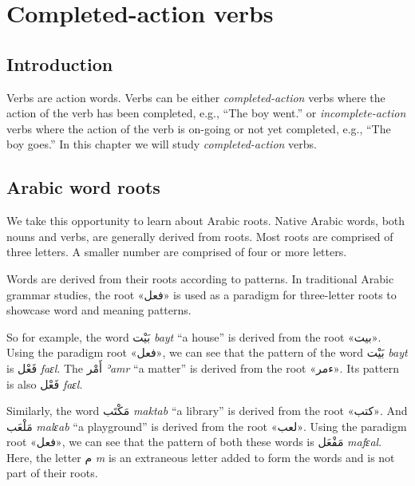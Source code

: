 \documentclass[
  10pt,
]{book}
\begin{document}
\chapter{Completed-action verbs}\label{completed-action-verbs}

\section{Introduction}\label{introduction-4}

Verbs are action words. Verbs can be either \emph{completed-action} verbs where the action of the verb has been completed, e.g., \enquote{The boy went.} or \emph{incomplete-action} verbs where the action of the verb is on-going or not yet completed, e.g., \enquote{The boy goes.} In this chapter we will study \emph{completed-action} verbs.

\section{Arabic word roots}\label{arabic-word-roots}

We take this opportunity to learn about Arabic roots.
Native Arabic words, both nouns and verbs, are generally derived from roots. Most roots are comprised of three letters. A smaller number are comprised of four or more letters.

Words are derived from their roots according to patterns. In traditional Arabic grammar studies, the root \foreignlanguage{arabic}{«فعل»} is used as a paradigm for three-letter roots to showcase word and meaning patterns.

So for example, the word \foreignlanguage{arabic}{بَيْت} \emph{bayt} \enquote{a house} is derived from the root \foreignlanguage{arabic}{«بيت»}. Using the paradigm root \foreignlanguage{arabic}{«فعل»}, we can see that the pattern of the word \foreignlanguage{arabic}{بَيْت} \emph{bayt} is \foreignlanguage{arabic}{فَعْل} \emph{faɛl}.
The \foreignlanguage{arabic}{أَمْر} \emph{ʾamr} \enquote{a matter} is derived from the root \foreignlanguage{arabic}{«ءمر»}. Its pattern is also \foreignlanguage{arabic}{فَعْل} \emph{faɛl}.

Similarly, the word \foreignlanguage{arabic}{مَکْتَب} \emph{maktab} \enquote{a library} is derived from the root \foreignlanguage{arabic}{«کتب»}. And \foreignlanguage{arabic}{مَلْعَب} \emph{malɛab} \enquote{a playground} is derived from the root \foreignlanguage{arabic}{«لعب»}. Using the paradigm root \foreignlanguage{arabic}{«فعل»}, we can see that the pattern of both these words is \foreignlanguage{arabic}{مَفْعَل} \emph{mafɛal}. Here, the letter \foreignlanguage{arabic}{م} \emph{m} is an extraneous letter added to form the words and is not part of their roots.
\end{document}
